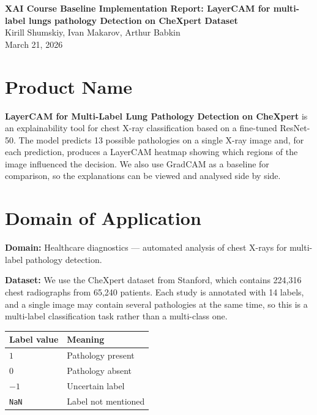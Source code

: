 \documentclass[12pt]{article}
\begin{document}
\begin{center}
    {\LARGE \textbf{XAI Course Baseline Implementation Report: LayerCAM for multi-label lungs pathology Detection on CheXpert Dataset}} \\[1.2em]
    {\large Kirill Shumskiy, Ivan Makarov, Arthur Babkin} \\[0.6em]
    {\large March 21, 2026}
\end{center}

\section{Product Name}

\textbf{LayerCAM for Multi-Label Lung Pathology Detection on CheXpert} is an explainability tool for chest X-ray classification based on a fine-tuned ResNet-50. The model predicts 13 possible pathologies on a single X-ray image and, for each prediction, produces a LayerCAM heatmap showing which regions of the image influenced the decision. We also use GradCAM as a baseline for comparison, so the explanations can be viewed and analysed side by side.

\section{Domain of Application}

\textbf{Domain:} Healthcare diagnostics --- automated analysis of chest X-rays for multi-label pathology detection.

\textbf{Dataset:} We use the CheXpert dataset from Stanford, which contains 224,316 chest radiographs from 65,240 patients. Each study is annotated with 14 labels, and a single image may contain several pathologies at the same time, so this is a multi-label classification task rather than a multi-class one.

\begin{center}
\begin{tabular}{ll}
\toprule
\textbf{Label value} & \textbf{Meaning} \\
\midrule
$1$          & Pathology present \\
$0$          & Pathology absent \\
$-1$         & Uncertain label \\
\texttt{NaN} & Label not mentioned \\
\bottomrule
\end{tabular}
\end{center}
\end{document}
